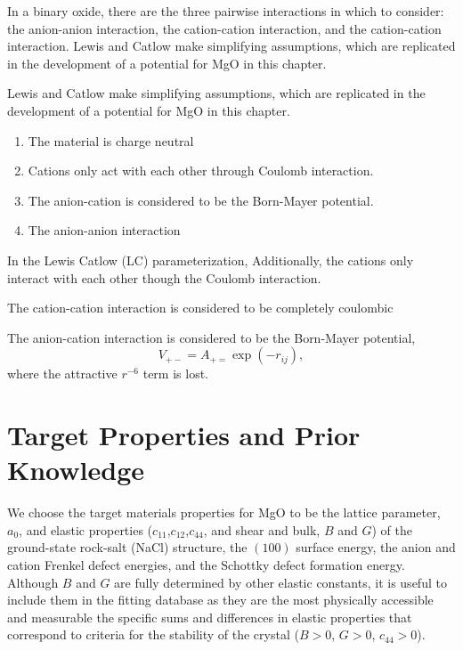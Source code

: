 In a binary oxide, there are the three pairwise interactions in which to consider: the anion-anion interaction, the cation-cation interaction, and the cation-cation interaction.  
Lewis and Catlow make simplifying assumptions, which are replicated in the development of a potential for MgO in this chapter.

Lewis and Catlow make simplifying assumptions\cite{catlow1977_buckingham,lewis1985_buckingham,sangster1980}, which are replicated in the development of a potential for MgO in this chapter.

\begin{enumerate}
\item The material is charge neutral
\item Cations only act with each other through Coulomb interaction.
\item The anion-cation is considered to be the Born-Mayer potential.
\item The anion-anion interaction
\end{enumerate}

In the Lewis Catlow (LC) parameterization,
Additionally, the cations only interact with each other though the Coulomb interaction.

The cation-cation interaction is considered to be completely coulombic

The anion-cation interaction is considered to be the Born-Mayer potential,
\begin{equation}
	V_{+-} = A_{+=}\exp(-r_{ij}),
\end{equation}
where the attractive $r^{-6}$ term is lost.
\section{Target Properties and Prior Knowledge}

We choose the target materials properties for MgO to be the lattice parameter, $a_0$, and elastic properties ($c_{11}$,$c_{12}$,$c_{44}$, and shear and bulk, $B$ and $G$) of the ground-state rock-salt (NaCl) structure, the $(100)$ surface energy, the anion and cation Frenkel defect energies, and the Schottky defect formation energy.  
Although $B$ and $G$ are fully determined by other elastic constants, it is useful to include them in the fitting database as they are the most physically accessible and measurable the specific sums and differences in elastic properties that correspond to criteria for the stability of the crystal ($B> 0$, $G>0$, $c_{44}> 0$).  

